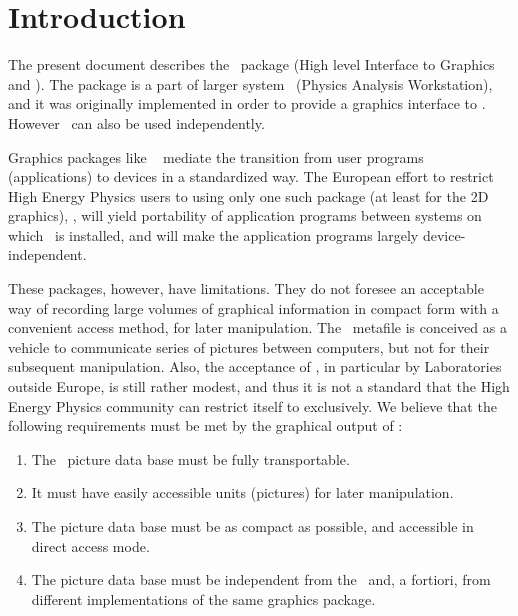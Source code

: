 
\chapter{Introduction}
The present document describes the \HIGZ~package
(High level Interface to Graphics and \ZEBRA). The package is a part of
larger system \PAW~(Physics Analysis Workstation)\cite{bib-PAW},
and it was originally implemented in order to provide a
graphics interface to \PAW. However \HIGZ~can also be used independently.
\par 
Graphics packages like \GKS~\cite{bib-GKS1} mediate the transition from user
programs (applications) to devices in a standardized way. The European effort 
to restrict High Energy Physics users to using only one such package (at least
for the 2D graphics), \GKS, will yield portability of application programs
between systems on which \GKS~is installed, and will make the application 
programs largely device-independent.
\par
These packages, however, have limitations. They do not foresee an acceptable way
of recording large volumes of graphical information in compact form with a 
convenient access method, for later manipulation. The \GKS~metafile is
 conceived as a vehicle to communicate series of pictures
between computers, but not for their subsequent manipulation. Also, the 
acceptance of \GKS, in particular by Laboratories outside Europe, is still
rather modest, and thus it is not a standard that the High Energy Physics
community can restrict itself to exclusively. We believe that the following
requirements must be met by the graphical output of \PAW:
\begin{enumerate}
\item The \PAW~picture data base must be fully transportable.
\item It must have easily accessible units (pictures) for later manipulation.
\item The picture data base must be as compact as possible, and accessible in
      direct access mode.
\item The picture data base must be independent from the \UGP~and, a fortiori,
      from different implementations of the same graphics package.
\end{enumerate}
